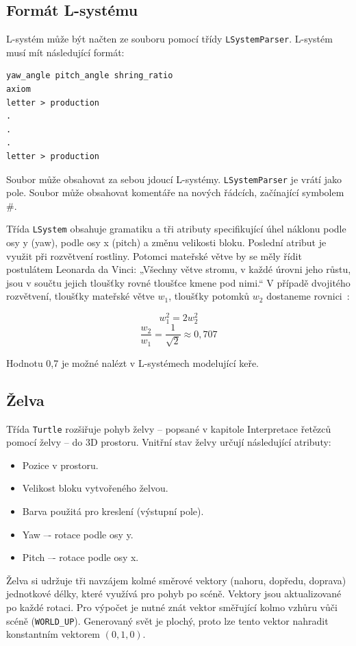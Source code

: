 \documentclass[thesis=M,czech]{FITthesis}[2019/12/23]
\begin{document}
\subsection{Formát L-systému}

L-systém může být načten ze souboru pomocí třídy \texttt{LSystemParser}. L-systém musí mít následující formát:

\begin{verbatim}
yaw_angle pitch_angle shring_ratio
axiom
letter > production
.
.
.
letter > production
\end{verbatim}

Soubor může obsahovat za sebou jdoucí L-systémy. \texttt{LSystemParser} je vrátí jako pole. Soubor může obsahovat komentáře na nových řádcích, začínající symbolem \#.

Třída \texttt{LSystem} obsahuje gramatiku a tři atributy specifikující úhel náklonu podle osy y (yaw), podle osy x (pitch) a změnu velikosti bloku. Poslední atribut je využit při rozvětvení rostliny. Potomci mateřské větve by se měly řídit postulátem Leonarda da Vinci: „Všechny větve stromu, v každé úrovni jeho růstu, jsou v součtu jejich tloušťky rovné tloušťce kmene pod nimi.“ V případě dvojitého rozvětvení, tloušťky mateřské větve $w_1$, tloušťky potomků $w_2$ dostaneme rovnici~\cite{abop57}:

\[ w_1^2 = 2w_2^2 \]
\[ \frac{w_2}{w_1} = \frac{1}{\sqrt{2}} \approx 0,707\]

Hodnotu 0,7 je možné nalézt v L-systémech modelující keře.

\subsection{Želva}
Třída \texttt{Turtle} rozšiřuje pohyb želvy -- popsané v kapitole Interpretace řetězců pomocí želvy -- do 3D prostoru. Vnitřní stav želvy určují následující atributy:

\begin{itemize}
\item Pozice v prostoru.
\item Velikost bloku vytvořeného želvou.
\item Barva použitá pro kreslení (výstupní pole).
\item Yaw –- rotace podle osy y.
\item Pitch –- rotace podle osy x.
\end{itemize}

Želva si udržuje tři navzájem kolmé směrové vektory (nahoru, dopředu, doprava) jednotkové délky, které využívá pro pohyb po scéně. Vektory jsou aktualizované po každé rotaci. Pro výpočet je nutné znát vektor směřující kolmo vzhůru vůči scéně (\texttt{WORLD\_UP}). Generovaný svět je plochý, proto lze tento vektor nahradit konstantním vektorem $(0, 1, 0)$.
\end{document}
